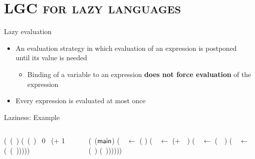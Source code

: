 \section{\scshape LGC for lazy languages}
\begin{frame} {Lazy evaluation}
\begin{itemize}[<+->]
\item An evaluation  strategy in which evaluation of  an expression is
  postponed until its value is needed
  \begin{itemize}
  \item Binding  of a  variable to  an expression  {\bf does  not force
    evaluation} of the expression
  \end{itemize}
\item Every expression is evaluated at most once
\end{itemize}
\end{frame}
\begin{frame} {Laziness:  Example}
\small
\begin{columns}
\begin{column}[T]{.45\textwidth}
  \renewcommand{\arraystretch}{1.1}{
    \begin{uprogram}
      \UFL (\DEFINE\ (\length~\xl)
       (\SIF\  (\NULLQ~\xl)
        \RETURN~0
        \RETURN~(+ 1 (\length~(\CDR~\xl)))))
  \end{uprogram}}
\end{column}
\begin{column}[T]{0.45\textwidth}
\renewcommand{\arraystretch}{1.1}{
  \begin{uprogram}
    \UFL (\DEFINE\ (${\sf main}$)
      (\LET\  \pa\  $\leftarrow$
    (
    ) \IN 
     (\LET\  \pb\  $\leftarrow$ ($+$\ \pa\ \acdr) \IN
       (\LET\ \pc\ $\leftarrow$  (\CONS\ \pb\ \NIL) \IN
         (\LET\ \pw\  $\leftarrow$  (\length\ \pc) \IN
         (\RETURN~\pw))))))
  \end{uprogram}
}
\end{column}
\end{columns}
\end{frame}
